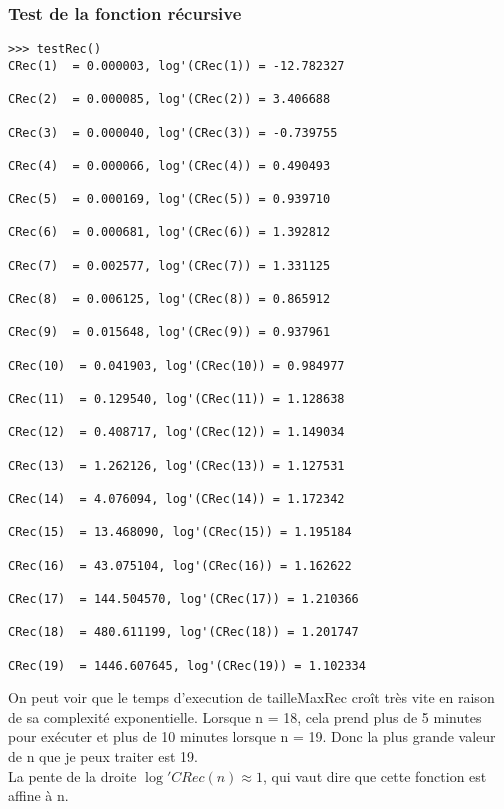 \documentclass[french]{article}
\begin{document}
\subsubsection{Test de la fonction récursive}
\begin{lstlisting}
>>> testRec()
CRec(1)  = 0.000003, log'(CRec(1)) = -12.782327

CRec(2)  = 0.000085, log'(CRec(2)) = 3.406688

CRec(3)  = 0.000040, log'(CRec(3)) = -0.739755

CRec(4)  = 0.000066, log'(CRec(4)) = 0.490493

CRec(5)  = 0.000169, log'(CRec(5)) = 0.939710

CRec(6)  = 0.000681, log'(CRec(6)) = 1.392812

CRec(7)  = 0.002577, log'(CRec(7)) = 1.331125

CRec(8)  = 0.006125, log'(CRec(8)) = 0.865912

CRec(9)  = 0.015648, log'(CRec(9)) = 0.937961

CRec(10)  = 0.041903, log'(CRec(10)) = 0.984977

CRec(11)  = 0.129540, log'(CRec(11)) = 1.128638

CRec(12)  = 0.408717, log'(CRec(12)) = 1.149034

CRec(13)  = 1.262126, log'(CRec(13)) = 1.127531

CRec(14)  = 4.076094, log'(CRec(14)) = 1.172342

CRec(15)  = 13.468090, log'(CRec(15)) = 1.195184

CRec(16)  = 43.075104, log'(CRec(16)) = 1.162622

CRec(17)  = 144.504570, log'(CRec(17)) = 1.210366

CRec(18)  = 480.611199, log'(CRec(18)) = 1.201747

CRec(19)  = 1446.607645, log'(CRec(19)) = 1.102334

\end{lstlisting}
On peut voir que le temps d'execution de tailleMaxRec croît très vite en raison de sa complexité exponentielle. Lorsque n = 18, cela prend plus de 5 minutes pour exécuter et plus de 10 minutes lorsque n = 19. Donc la plus grande valeur de n que je peux traiter est 19.\\
La pente de la droite $\log' CRec(n) \approx 1$, qui vaut dire que cette fonction est affine à n.
\end{document}
